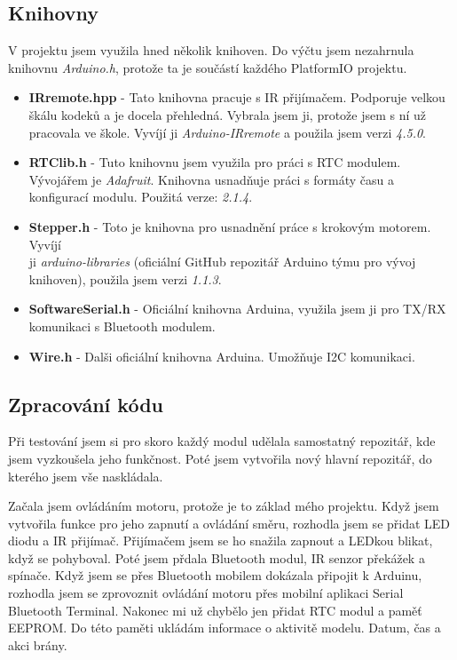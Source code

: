\documentclass[12pt, a4paper,
twoside,        %
openright
]{report}
\begin{document}
	\subsection{Knihovny}
	V projektu jsem využila hned několik knihoven. Do výčtu jsem nezahrnula knihovnu \textit{Arduino.h}, protože ta je součástí každého PlatformIO projektu. 
	\begin{itemize}
		\item \textbf{IRremote.hpp} - Tato knihovna pracuje s IR přijímačem. Podporuje velkou škálu kodeků a je docela přehledná. Vybrala jsem ji, protože jsem s ní už pracovala ve škole. Vyvíjí ji \textit{Arduino-IRremote} a použila jsem verzi \textit{4.5.0}.
		\item \textbf{RTClib.h} - Tuto knihovnu jsem využila pro práci s RTC modulem. Vývojářem je \textit{Adafruit}. Knihovna usnadňuje práci s formáty času a konfigurací modulu. Použitá verze: \textit{2.1.4}.
		\item \textbf{Stepper.h} - Toto je knihovna pro usnadnění práce s krokovým motorem. Vyvíjí\\ ji \textit{arduino-libraries} (oficiální GitHub repozitář Arduino týmu pro vývoj knihoven), použila jsem verzi \textit{1.1.3}.
		\item \textbf{SoftwareSerial.h} - Oficiální knihovna Arduina, využila jsem ji pro TX/RX komunikaci s Bluetooth modulem.
		\item \textbf{Wire.h} - Dalši oficiální knihovna Arduina. Umožňuje I2C komunikaci. 
	\end{itemize}
	
	\subsection{Zpracování kódu}
	Při testování jsem si pro skoro každý modul udělala samostatný repozitář, kde jsem vyzkoušela jeho funkčnost. Poté jsem vytvořila nový hlavní repozitář, do kterého jsem vše naskládala.
	
	Začala jsem ovládáním motoru, protože je to základ mého projektu. Když jsem vytvořila funkce pro jeho zapnutí a ovládání směru, rozhodla jsem se přidat LED diodu a IR přijímač. Přijímačem jsem se ho snažila zapnout a LEDkou blikat, když se pohyboval. Poté jsem přdala Bluetooth modul, IR senzor překážek a spínače. Když jsem se přes Bluetooth mobilem dokázala připojit k Arduinu, rozhodla jsem se zprovoznit ovládání motoru přes mobilní aplikaci Serial Bluetooth Terminal. Nakonec mi už chybělo jen přidat RTC modul a paměť EEPROM. Do této paměti ukládám informace o aktivitě modelu. Datum, čas a akci brány.
	
\end{document}
